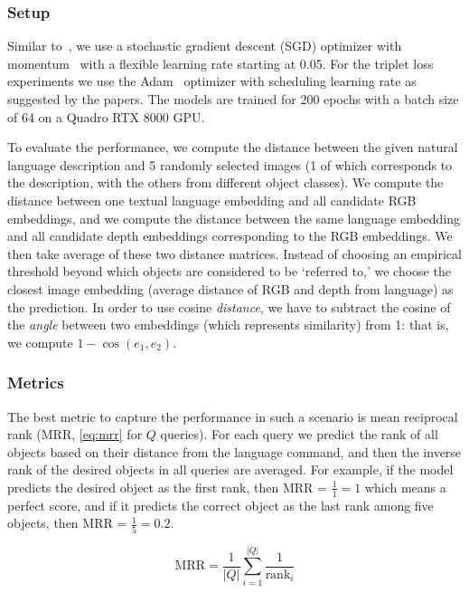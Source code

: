 \documentclass[sigconf,natbib=true,anonymous=true]{acmart}
\begin{document}
\subsubsection{Setup}
\label{sec:setup}
Similar to~\citet{NEURIPS2020_supervised_contrastive}, we use a stochastic gradient descent (SGD) optimizer with momentum~\cite{ruder2016overviewSGD} with a flexible learning rate starting at 0.05. 
For the triplet loss experiments we use the Adam~\cite{kingma_adam_2015} optimizer with scheduling learning rate as suggested by the papers.
The models are trained for 200 epochs with a batch size of 64 on a Quadro RTX 8000 GPU.


To evaluate the performance, we compute the distance between the given natural language description and 5 randomly selected images (1 of which corresponds to the description, with the others from different object classes). We compute the distance between one textual language embedding and all candidate RGB embeddings, and we compute the distance between the same language embedding and all candidate depth embeddings corresponding to the RGB embeddings. We then take average of these two distance matrices. Instead of choosing an empirical threshold beyond which objects are considered to be `referred to,' we choose the closest image embedding (average distance of RGB and depth from language) as the prediction.
In order to use cosine \textit{distance}, we have to subtract the cosine of the \textit{angle} between two embeddings (which represents similarity) from 1: that is, we compute $1 - \cos(e_1, e_2)$.

\subsubsection{Metrics}

The best metric to capture the performance in such a scenario is mean reciprocal rank (MRR, \cref{eq:mrr} for $Q$ queries). For each query we predict the rank of all objects based on their distance from the language command, and then the inverse rank of the desired objects in all queries are averaged. For example, if the model predicts the desired object as the first rank, then MRR = $\frac{1}{1} = 1$ which means a perfect score, and if it predicts the correct object as the last rank among five objects, then MRR = $\frac{1}{5}=0.2$. 

\begin{equation} \label{eq:mrr}
    \mathrm{MRR}=\frac{1}{|Q|} \sum_{i=1}^{|Q|} \frac{1}{\operatorname{rank}_{i}}
\end{equation}
\end{document}
